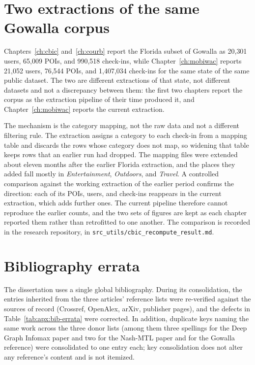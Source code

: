

\section{Two extractions of the same Gowalla corpus}
\label{apx:errata:corpus}

Chapters~\ref{ch:cbic} and~\ref{ch:courb} report the Florida subset of Gowalla as
20{,}301 users, 65{,}009 POIs, and 990{,}518 check-ins, while Chapter~\ref{ch:mobiwac}
reports 21{,}052 users, 76{,}544 POIs, and 1{,}407{,}034 check-ins for the same state
of the same public dataset. The two are different extractions of that state, not
different datasets and not a discrepancy between them: the first two chapters report the
corpus as the extraction pipeline of their time produced it, and
Chapter~\ref{ch:mobiwac} reports the current extraction.

The mechanism is the category mapping, not the raw data and not a different filtering
rule. The extraction assigns a category to each check-in from a mapping table and
discards the rows whose category does not map, so widening that table keeps rows that an
earlier run had dropped. The mapping files were extended about eleven months after the
earlier Florida extraction, and the places they added fall mostly in
\emph{Entertainment}, \emph{Outdoors}, and \emph{Travel}. A controlled comparison against
the working extraction of the earlier period confirms the direction: each of its POIs,
users, and check-ins reappears in the current extraction, which adds further ones. The
current pipeline therefore cannot reproduce the earlier counts, and the two sets of
figures are kept as each chapter reported them rather than retrofitted to one another.
The comparison is recorded in the research repository, in
\texttt{src\_utils/cbic\_recompute\_result.md}.


\section{Bibliography errata}
\label{apx:errata:bib}

The dissertation uses a single global bibliography. During its consolidation, the
entries inherited from the three articles' reference lists were re-verified against
the sources of record (Crossref, OpenAlex, arXiv, publisher pages), and the defects in
Table~\ref{tab:apx:bib-errata} were corrected. In addition, duplicate keys naming the
same work across the three donor lists (among them three spellings for the Deep Graph
Infomax paper and two for the Nash-MTL paper and for the Gowalla reference) were
consolidated to one entry each; key consolidation does not alter any reference's
content and is not itemized.


